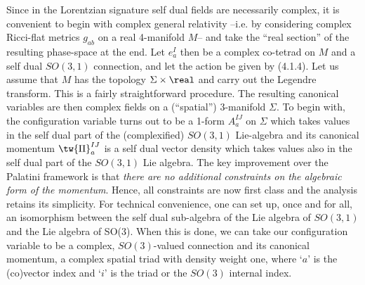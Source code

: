 Since in the Lorentzian signature self dual fields are necessarily complex,
it is convenient to begin with complex general relativity --i.e. by
considering complex Ricci-flat metrics $g_{ab}$ on a real 4-manifold $M$--
and take the ``real section'' of the resulting phase-space at the end.
Let $e_a^I$ then be a complex co-tetrad on $M$  and \fA\- a self dual
$SO(3,1)$ connection, and let the action be given by (4.1.4). Let us assume
that $M$ has the topology $\Sigma\times\real$ and carry out the Legendre
transform. This is a fairly straightforward procedure. The resulting canonical
variables are then complex fields on a (``spatial'') 3-manifold $\Sigma$.
To begin with, the configuration variable turns out to be a 1-form $A_a^{IJ}$
on $\Sigma$ which takes values in the self dual part of the (complexified)
$SO(3,1)$ Lie-algebra and its canonical momentum $\tw{\Pi}_a^{IJ}$
is a self dual vector density which takes values also in the self dual
part of the $SO(3,1)$ Lie algebra. The key improvement over the Palatini
framework is that {\it there are no additional constraints on the algebraic
form of the momentum}. Hence, all constraints are now first class and the
analysis retains its simplicity. For technical convenience, one can set up,
once and for all, an isomorphism between the self dual sub-algebra of the Lie
algebra of $SO(3,1)$ and the Lie algebra of SO(3). When this is done, we can
take our configuration variable to be a complex, $SO(3)$-valued connection
\A\- and its canonical momentum, a complex spatial triad \E\- with density
weight one, where `$a$' is the (co)vector index and `$i$' is the triad or the
$SO(3)$ internal index.

